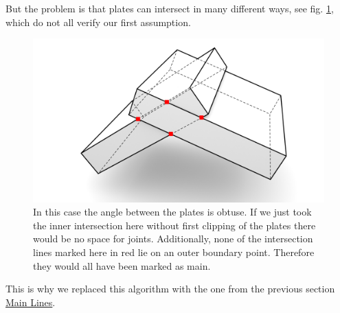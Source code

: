 \documentclass[../ClassicThesis.tex]{subfiles}
\begin{document}
But the problem is that plates can intersect in many different ways, see fig. \ref{fig:obtuseAssumption}, which do not all verify our first assumption. 
\begin{figure}[!ht]
\centering
\includegraphics[width=\columnwidth]{Images/Blocks_obtuse_overintersect.png}
\caption{In this case the angle between the plates is obtuse. If we just took the inner intersection here without first clipping of the plates there would be no space for joints. Additionally, none of the intersection lines marked here in red lie on an outer boundary point. Therefore they would all have been marked as main. }
\label{fig:obtuseAssumption}
\end{figure}
This is why we replaced this algorithm with the one from the previous section \hyperref[mainLine]{Main Lines}.
\end{document}
